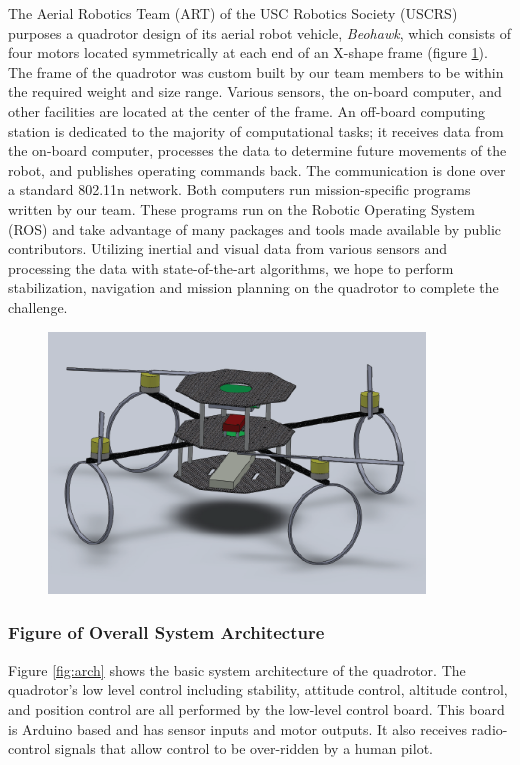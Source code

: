\documentclass[12pt, letterpaper]{article}
\begin{document}
The Aerial Robotics Team (ART) of the USC Robotics Society (USCRS) purposes a quadrotor design of its aerial robot vehicle, \textit{Beohawk}, which consists of four motors located symmetrically at each end of an X-shape frame (figure \ref{fig:beohawk}). The frame of the quadrotor was custom built by our team members to be within the required weight and size range. Various sensors, the on-board computer, and other facilities are located at the center of the frame. An off-board computing station is dedicated to the majority of computational tasks; it receives data from the on-board computer, processes the data to determine future movements of the robot, and publishes operating commands back. The communication is done over a standard 802.11n network. Both computers run mission-specific programs written by our team. These programs run on the Robotic Operating System (ROS) and take advantage of many packages and tools made available by public contributors. Utilizing inertial and visual data from various sensors and processing the data with state-of-the-art algorithms, we hope to perform stabilization, navigation and mission planning on the quadrotor to complete the challenge.

\begin{figure}[h]
\centering
\includegraphics[width=10cm]{images/Beohawk_V3.png}
\label{fig:beohawk}
\end{figure}

\subsubsection{Figure of Overall System Architecture}

Figure \ref{fig:arch} shows the basic system architecture of the quadrotor. The quadrotor's low level control including stability, attitude control, altitude control, and position control are all performed by the low-level control board. This board is Arduino based and has sensor inputs and motor outputs. It also receives radio-control signals that allow control to be over-ridden by a human pilot.
\end{document}
